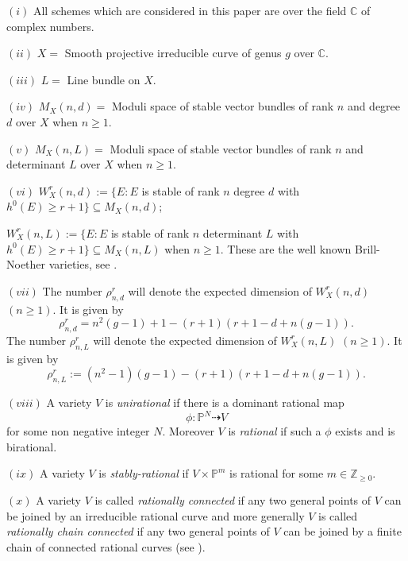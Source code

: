\documentclass[12pt, reqno]{amsart}
\begin{document}
$(i)$ All schemes which are considered in this paper are over the field $\mathbb{C}$ of complex numbers.

$(ii)$ $X=$ Smooth projective irreducible curve of genus $g$ over $\mathbb{C}$.

$(iii)$  $L=$ Line bundle on $X$.

$(iv)$ $M_{X}(n,d)=$ Moduli space of stable vector bundles of rank $n$ and degree $d$ over $X$ when $n\geq 1$.


$(v)$  $M_{X}(n,L)=$ Moduli space of stable vector bundles of rank $n$ and determinant $L$ over $X$ when $n\geq 1$.


$(vi)$  $W^{r}_{X}(n,d):=\{E: E$ is stable of rank $n$ degree $d$ with $h^{0}(E)\geq r+1\}\subseteq M_{X}(n,d)$; 

$W^{r}_{X}(n,L):=\{E: E$ is stable of rank $n$ determinant $L$ with $h^{0}(E)\geq r+1\}\subseteq M_{X}(n,L)$ when $n\geq 1$. These are the well known Brill-Noether varieties, see \cite[\S1, 1.1]{bgn}. 

$(vii)$  The number $\rho^{r}_{n,d}$ will denote the expected dimension of $W^{r}_{X}(n,d)$ $(n\geq 1)$. It is given by
\[\rho^{r}_{n,d}= n^{2}(g-1)+1-(r+1)(r+1-d+n(g-1)).\]
The number $\rho^{r}_{n,L}$ will denote the expected dimension of $W^{r}_{X}(n,L)$ $(n\geq 1)$. It is given by
\[\rho^{r}_{n,L}:= (n^{2}-1)(g-1)-(r+1)(r+1-d+n(g-1)).\]

$(viii)$ A variety $V$ is {\it unirational} if there is a dominant rational map 
\[\phi: \mathbb{P}^{N}\dashrightarrow V\] for some non negative integer $N$. Moreover $V$ is {\it rational} if such a $\phi$ exists and is birational.

$(ix)$ A variety $V$ is {\it stably-rational} if $V\times \mathbb{P}^{m}$ is rational for some $m\in \mathbb{Z}_{\geq 0}$.

$(x)$ A variety $V$ is called {\it rationally connected} if any two general points of $V$ can be joined by an irreducible rational curve and more generally $V$ is called {\it rationally chain connected} if any two general points of $V$ can be joined by a finite chain of connected rational curves (see \cite{Kollar}).
\end{document}
